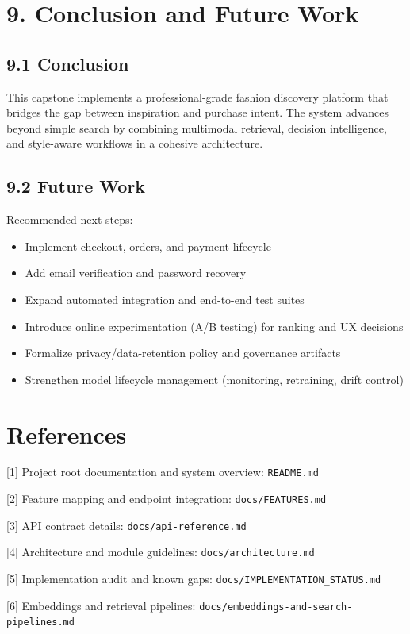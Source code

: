 \documentclass[12pt,a4paper]{report}
\begin{document}
\chapter{9. Conclusion and Future Work}
\section{9.1 Conclusion}
This capstone implements a professional-grade fashion discovery platform that bridges the gap between inspiration and purchase intent. The system advances beyond simple search by combining multimodal retrieval, decision intelligence, and style-aware workflows in a cohesive architecture.


\section{9.2 Future Work}
Recommended next steps:

\begin{itemize}
\item Implement checkout, orders, and payment lifecycle
\item Add email verification and password recovery
\item Expand automated integration and end-to-end test suites
\item Introduce online experimentation (A/B testing) for ranking and UX decisions
\item Formalize privacy/data-retention policy and governance artifacts
\item Strengthen model lifecycle management (monitoring, retraining, drift control)
\end{itemize}

\chapter{References}
[1] Project root documentation and system overview: \texttt{README.md}

[2] Feature mapping and endpoint integration: \texttt{docs/FEATURES.md}

[3] API contract details: \texttt{docs/api-reference.md}

[4] Architecture and module guidelines: \texttt{docs/architecture.md}

[5] Implementation audit and known gaps: \texttt{docs/IMPLEMENTATION\_STATUS.md}

[6] Embeddings and retrieval pipelines: \texttt{docs/embeddings-and-search-pipelines.md}
\end{document}

